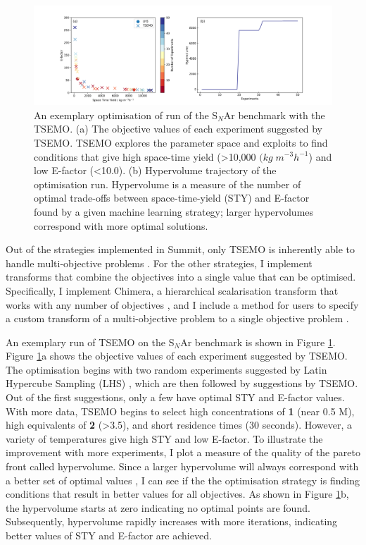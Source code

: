 \begin{figure}
    \centering
    \includegraphics[width=\textwidth]{gfx/Chapter03/snar_tsemo_pareto_hv.png}
    \caption{An exemplary optimisation of run of the S$_N$Ar benchmark with the TSEMO. (a) The objective values of each experiment suggested by TSEMO. TSEMO explores the parameter space and exploits to find conditions that give high space-time yield (>10,000 $(kg \; m^{-3} h^{-1}$) and low E-factor (<10.0). (b) Hypervolume trajectory of the optimisation run. Hypervolume is a measure of the number of optimal trade-offs between space-time-yield (STY) and E-factor found by a given machine learning strategy; larger hypervolumes correspond with more optimal solutions.}
    \label{fig:S$_N$Ar_tsemo}
\end{figure}

Out of the strategies implemented in Summit, only TSEMO is inherently able to handle multi-objective problems \cite{Bradford2018}. For the other strategies, I implement transforms that combine the objectives into a single value that can be optimised. Specifically, I implement Chimera, a hierarchical scalarisation transform that works with any number of objectives \cite{Hase2018b}, and I include a method for users to specify a custom transform of a multi-objective problem to a single objective problem \cite{Fitzpatrick2016, Epps2020}.

An exemplary run of TSEMO on the S$_N$Ar benchmark is shown in Figure \ref{fig:S$_N$Ar_tsemo}. Figure \ref{fig:S$_N$Ar_tsemo}a shows the objective values of each experiment suggested by TSEMO. The optimisation begins with two random experiments suggested by Latin Hypercube Sampling (LHS) \cite{McKay1979}, which are then followed by suggestions by TSEMO. Out of the first suggestions, only a few have optimal STY and E-factor values. With more data, TSEMO begins to select high concentrations of \textbf{1} (near 0.5 M), high equivalents of \textbf{2} (>3.5), and short residence times (30 seconds). However, a variety of temperatures give high STY and low E-factor. To illustrate the improvement with more experiments, I plot a measure of the quality of the pareto front called hypervolume. Since a larger hypervolume will always correspond with a better set of optimal values \cite{Zitzler2003}, I can see if the the optimisation strategy is finding conditions that result in better values for all objectives. As shown in Figure \ref{fig:S$_N$Ar_tsemo}b, the hypervolume starts at zero indicating no optimal points are found. Subsequently, hypervolume rapidly increases with more iterations, indicating better values of STY and E-factor are achieved.

